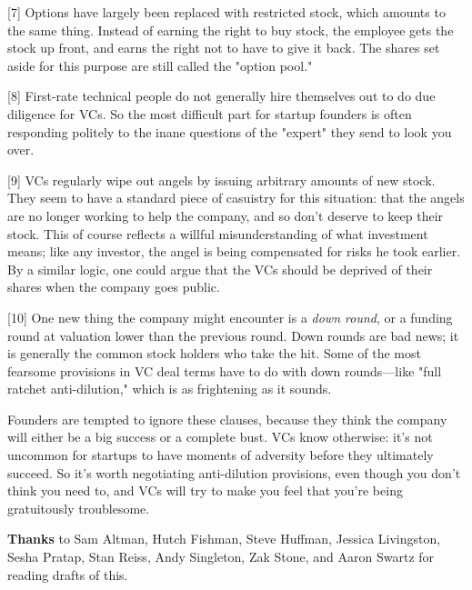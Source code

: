 [7]
Options have largely been replaced with restricted stock, which
amounts to the same thing.  Instead of earning the right to buy
stock, the employee gets the stock up front, and earns the right
not to have to give it back.  The shares set aside for this purpose
are still called the "option pool."

[8]
First-rate technical people do not generally hire themselves
out to do due diligence for VCs.  So the most difficult
part for startup founders is often responding politely to the inane
questions of the "expert" they send to look you over.

[9]
VCs regularly wipe out angels by issuing arbitrary amounts of
new stock.  They seem to have a standard piece of casuistry for
this situation: that the angels are no longer working to help the
company, and so don't deserve to keep their stock.  This of course
reflects a willful misunderstanding of what investment means; like
any investor, the angel is being compensated for risks he took
earlier.  By a similar logic, one could argue that the VCs should
be deprived of their shares when the company goes public.

[10]
One new thing the company might encounter is a \emph{down
round}, or a funding round at valuation lower than the previous
round.  Down rounds are bad news; it is generally the common stock
holders who take the hit.  Some of the most fearsome provisions in
VC deal terms have to do with down rounds---like "full ratchet
anti-dilution," which is as frightening as it sounds.

Founders are tempted to ignore these clauses, because they think
the company will either be a big success or a complete bust.  VCs
know otherwise: it's not uncommon for startups to have moments of
adversity before they ultimately succeed.  So it's worth negotiating
anti-dilution provisions, even though you don't think you need to,
and VCs will try to make you feel that you're being gratuitously
troublesome.

\textbf{Thanks} to Sam Altman, Hutch Fishman, Steve Huffman, Jessica
Livingston, Sesha Pratap, Stan Reiss, Andy Singleton, Zak Stone,
and Aaron Swartz for reading drafts of this.


